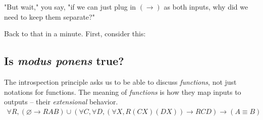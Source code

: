 \documentclass{article}
\begin{document}
  "But wait," you say, "if we can just plug in $(\to)$ as both inputs, why did we need to keep them separate?"
  
  Back to that in a minute. First, consider this:
  
  \subsection{Is \emph{modus ponens} true?}

  \iffalse
  The introspection principle asks us to be able to discuss \emph{functions}, not just notations for functions. The meaning of \emph{functions} is how they map inputs to outputs – their \emph{extensional} behavior.
  \begin{align*}
    \tag{extensionality}
    \forall R, (\varnothing \to R A B) \cup (\forall C,\forall D,(\forall X,R (C X) (D X)) \to R C D) \to (A \equiv B)\\
  \end{align*}
\end{document}
